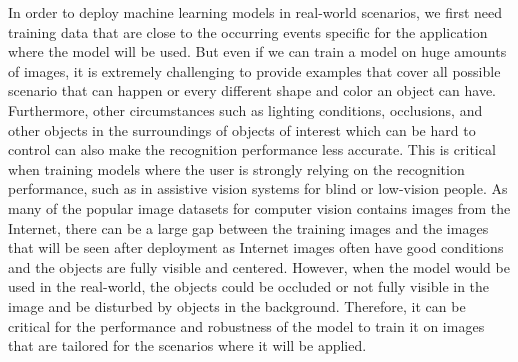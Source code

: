 In order to deploy machine learning models in real-world scenarios, we first need training data that are close to the occurring events specific for the application where the model will be used. 
But even if we can train a model on huge amounts of images, it is extremely challenging to provide examples that cover all possible scenario that can happen or every different shape and color an object can have. Furthermore, other circumstances such as lighting conditions, occlusions, and other objects in the surroundings of objects of interest which can be hard to control can also make the recognition performance less accurate. This is critical when training models where the user is strongly relying on the recognition performance, such as in assistive vision systems for blind or low-vision people. As many of the popular image datasets for computer vision contains images from the Internet, there can be a large gap between the training images and the images that will be seen after deployment as Internet images often have good conditions and the objects are fully visible and centered. However, when the model would be used in the real-world, the objects could be occluded or not fully visible in the image and be disturbed by objects in the background. Therefore, it can be critical for the performance and robustness of the model to train it on images that are tailored for the scenarios where it will be applied. 






